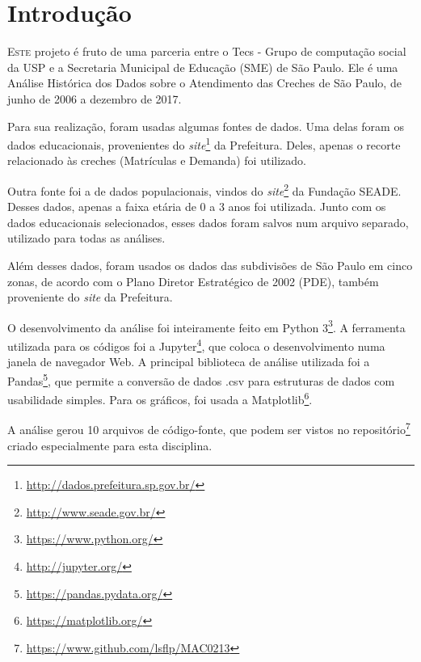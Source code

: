 \chapter{Introdução}

\lettrine{E}{ste} projeto é fruto de uma parceria entre o Tecs - Grupo de computação social da USP e a Secretaria Municipal de Educação (SME) de São Paulo. Ele é uma Análise Histórica dos Dados sobre o Atendimento das Creches de São Paulo, de junho de 2006 a dezembro de 2017.

Para sua realização, foram usadas algumas fontes de dados. Uma delas foram os dados educacionais, provenientes do \textit{site}\footnote{\url{http://dados.prefeitura.sp.gov.br/}} da Prefeitura. Deles, apenas o recorte relacionado às creches (Matrículas e Demanda) foi utilizado.

Outra fonte foi a de dados populacionais, vindos do \textit{site}\footnote{\url{http://www.seade.gov.br/}} da Fundação SEADE. Desses dados, apenas a faixa etária de 0 a 3 anos foi utilizada. Junto com os dados educacionais selecionados, esses dados foram salvos num arquivo separado, utilizado para todas as análises.

Além desses dados, foram usados os dados das subdivisões de São Paulo em cinco zonas, de acordo com o Plano Diretor Estratégico de 2002 (PDE), também proveniente do \textit{site} da Prefeitura.

O desenvolvimento da análise foi inteiramente feito em Python 3\footnote{\url{https://www.python.org/}}. A ferramenta utilizada para os códigos foi a Jupyter\footnote{\url{http://jupyter.org/}}, que coloca o desenvolvimento numa janela de navegador Web. A principal biblioteca de análise utilizada foi a Pandas\footnote{\url{https://pandas.pydata.org/}}, que permite a conversão de dados .csv para estruturas de dados com usabilidade simples. Para os gráficos, foi usada a Matplotlib\footnote{\url{https://matplotlib.org/}}.

A análise gerou 10 arquivos de código-fonte, que podem ser vistos no repositório\footnote{\url{https://www.github.com/lsflp/MAC0213}} criado especialmente para esta disciplina.